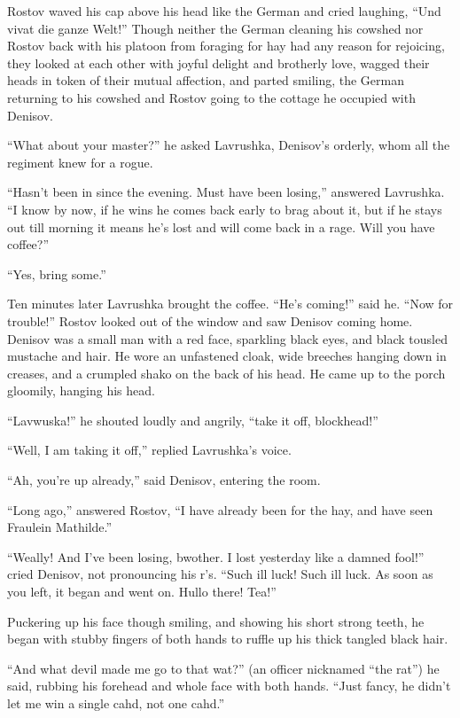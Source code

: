Rostov waved his cap above his head like the German and cried
laughing, ``Und vivat die ganze Welt!'' Though neither the German
cleaning his cowshed nor Rostov back with his platoon from
foraging for hay had any reason for rejoicing, they looked at
each other with joyful delight and brotherly love, wagged their
heads in token of their mutual affection, and parted smiling, the
German returning to his cowshed and Rostov going to the cottage
he occupied with Denisov.

``What about your master?'' he asked Lavrushka, Denisov's
orderly, whom all the regiment knew for a rogue.

``Hasn't been in since the evening. Must have been losing,''
answered Lavrushka. ``I know by now, if he wins he comes back
early to brag about it, but if he stays out till morning it means
he's lost and will come back in a rage. Will you have coffee?''

``Yes, bring some.''

Ten minutes later Lavrushka brought the coffee. ``He's coming!''
said he.  ``Now for trouble!'' Rostov looked out of the window
and saw Denisov coming home. Denisov was a small man with a red
face, sparkling black eyes, and black tousled mustache and
hair. He wore an unfastened cloak, wide breeches hanging down in
creases, and a crumpled shako on the back of his head. He came up
to the porch gloomily, hanging his head.

``Lavwuska!'' he shouted loudly and angrily, ``take it off,
blockhead!''

``Well, I am taking it off,'' replied Lavrushka's voice.

``Ah, you're up already,'' said Denisov, entering the room.

``Long ago,'' answered Rostov, ``I have already been for the hay,
and have seen Fraulein Mathilde.''

``Weally! And I've been losing, bwother. I lost yesterday like a
damned fool!'' cried Denisov, not pronouncing his r's. ``Such ill
luck! Such ill luck. As soon as you left, it began and went
on. Hullo there! Tea!''

Puckering up his face though smiling, and showing his short
strong teeth, he began with stubby fingers of both hands to
ruffle up his thick tangled black hair.

``And what devil made me go to that wat?'' (an officer nicknamed
``the rat'') he said, rubbing his forehead and whole face with
both hands.  ``Just fancy, he didn't let me win a single cahd,
not one cahd.''

